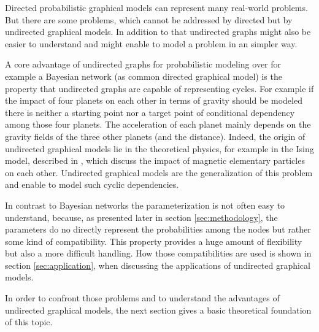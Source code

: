 Directed probabilistic graphical models can represent many real-world problems. But there are some problems, which cannot be addressed by directed but by undirected graphical models. In addition to that undirected graphs might also be easier to understand and might enable to model a problem in an simpler way.

A core advantage of undirected graphs for probabilistic modeling over for example a Bayesian network (as common directed graphical model) is the property that undirected graphs are capable of representing cycles. For example if the impact of four planets on each other in terms of gravity should be modeled there is neither a starting point nor a target point of conditional dependency among those four planets. The acceleration of each planet mainly depends on the gravity fields of the three other planets (and the distance). Indeed, the origin of undirected graphical models lie in the theoretical physics, for example in the Ising model, described in \cite{ising1925beitrag}, which discuss the impact of magnetic elementary particles on each other. Undirected graphical models are the generalization of this problem and enable to model such cyclic dependencies.

In contrast to Bayesian networks the parameterization is not often easy to understand, because, as presented later in section \ref{sec:methodology}, the parameters do no directly represent the probabilities among the nodes but rather some kind of compatibility. This property provides a huge amount of flexibility but also a more difficult handling. How those compatibilities are used is shown in section \ref{sec:application}, when discussing the applications of undirected graphical models. 

In order to confront those problems and to understand the advantages of undirected graphical models, the next section gives a basic theoretical foundation of this topic.
